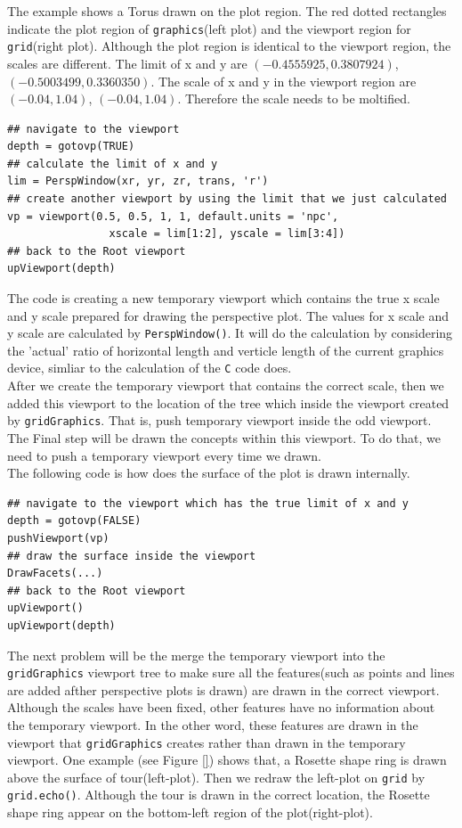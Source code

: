 \documentclass[paper=a4, fontsize=11pt]{report}
\begin{document}
The example shows a Torus drawn on the plot region. The red dotted rectangles indicate the plot region of \texttt{graphics}(left plot) and the viewport region for \texttt{grid}(right plot). Although the plot region is identical to the viewport region, the scales are different. The limit of x and y are $(-0.4555925,  0.3807924)$, $(-0.5003499,  0.3360350)$. The scale of x and y in the viewport region are $(-0.04,  1.04)$, $(-0.04,  1.04)$. Therefore the scale needs to be moltified. \\

\begin{lstlisting}
## navigate to the viewport
depth = gotovp(TRUE) 
## calculate the limit of x and y
lim = PerspWindow(xr, yr, zr, trans, 'r')  
## create another viewport by using the limit that we just calculated
vp = viewport(0.5, 0.5, 1, 1, default.units = 'npc',
                xscale = lim[1:2], yscale = lim[3:4]) 
## back to the Root viewport
upViewport(depth)  
\end{lstlisting}
The code is creating a new temporary viewport which contains the true x scale and y scale prepared for drawing the perspective plot. The values for x scale and y scale are calculated by \texttt{PerspWindow()}. It will do the calculation by considering the 'actual' ratio of horizontal length and verticle length of the current graphics device, simliar to the calculation of the \texttt{C} code does.\\
After we create the temporary viewport that contains the correct scale, then we added this viewport to the location of the tree which inside the viewport created by \texttt{gridGraphics}. That is, push temporary viewport inside the odd viewport. The Final step will be drawn the concepts within this viewport. To do that, we need to push a temporary viewport every time we drawn.\\ 
The following code is how does the surface of the plot is drawn internally.
\begin{lstlisting}
## navigate to the viewport which has the true limit of x and y
depth = gotovp(FALSE)
pushViewport(vp)
## draw the surface inside the viewport
DrawFacets(...)
## back to the Root viewport
upViewport()
upViewport(depth)
\end{lstlisting}

The next problem will be the merge the temporary viewport into the \texttt{gridGraphics} viewport tree to make sure all the features(such as points and lines are added afther perspective plots is drawn) are drawn in the correct viewport. Although the scales have been fixed, other features have no information about the temporary viewport. In the other word, these features are drawn in the viewport that \texttt{gridGraphics} creates rather than drawn in the temporary viewport. One example (see Figure \ref{}) shows that, a Rosette shape ring is drawn above the surface of tour(left-plot). Then we redraw the left-plot on \texttt{grid} by \texttt{grid.echo()}. Although the tour is drawn in the correct location, the Rosette shape ring appear on the bottom-left region of the plot(right-plot).
\end{document}
